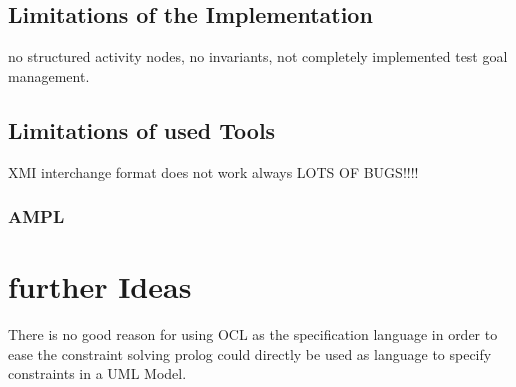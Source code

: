 \subsection{Limitations of the Implementation}
no structured activity nodes, no invariants, not completely implemented test goal management.
\subsection{Limitations of used Tools}
XMI interchange format does not work always LOTS OF BUGS!!!!
\subsubsection{AMPL}
\label{sec:LimitationsAMPL}
\section{further Ideas}
There is no good reason for using OCL as the specification language in order to ease the constraint solving prolog could directly be used as language to specify constraints in a UML Model.


